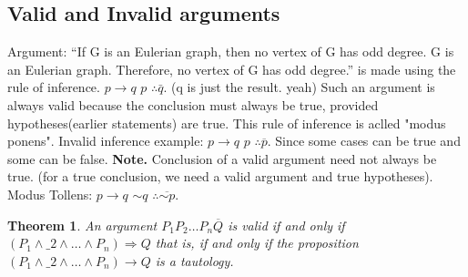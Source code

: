 \documentclass{article}
\newtheorem{theorem}{Theorem}                                       %
\begin{document}
\subsection{Valid and Invalid arguments}
Argument: “If G is an Eulerian graph, then no vertex of G has odd degree.
G is an Eulerian graph. Therefore, no vertex of G has odd degree.” is made using the rule of inference. 
\newline
$p \rightarrow q$
\newline
$p$
\newline
$\therefore \bar{q}.$
\newline
(q is just the result. yeah)
\newline
\newline
Such an argument is always valid because the conclusion must always be true, provided hypotheses(earlier statements) are true.
\newline
\newline
This rule of inference is aclled "modus ponens".
\newline
\newline
Invalid inference example:
\newline
$p \rightarrow q$
\newline
$p$
\newline
$\therefore \overline{p}.$
\newline
\newline
Since some cases can be true and some can be false.
\newline
\newline
\textbf{Note. } Conclusion of a valid argument need not always be true. (for a true conclusion, we need a valid argument and true hypotheses).
\newline
\newline
Modus Tollens:
\newline
$p \rightarrow q$
\newline
$\sim q$
\newline
$\therefore \overline{\sim p}.$
\newline
{}
\newline
\newline
\begin{theorem}
  An argument $P_1 P_2 \dots P_n \overline{Q}$ is valid if and only if $(P_1 \land \_2 \land \dots \land P_n) \Longrightarrow Q$ that is, if and only if the proposition $(P_1 \land \_2 \land \dots \land P_n) \longrightarrow Q$ is a tautology.
\end{theorem}
\end{document}
